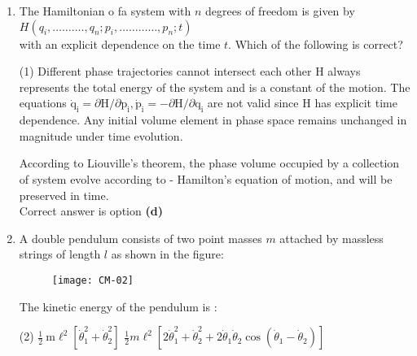 \begin{enumerate}
\begin{answer}
\begin{align*}
		\end{align*}
		The expression in bracket is just the total time derivative of $\lambda(\vec{x}, t)$.\\
		If we add a total time derivative of a function of $\overrightarrow{\mathrm{x}}$ and $\mathrm{t}$ to the Lagrangian, the equations of motion do not change.\\
		Correct answer is option \textbf{(d)}
	\end{answer}
	\item The Hamiltonian o fa system with $n$ degrees of freedom is given by \\$H\left(q_{i}, \ldots \ldots \ldots ., q_{n} ; p_{i}, \ldots \ldots \ldots \ldots, p_{n} ; t\right)$\\
	with an explicit dependence on the time $t$. Which of the following is correct?
	 \begin{tasks}(1)
		\task[\textbf{a.}]Different phase trajectories cannot intersect each other
		\task[\textbf{b.}]H always represents the total energy of the system and is a constant of the motion.
		\task[\textbf{c.}]The equations $\dot{\mathrm{q}}_{\mathrm{i}}=\partial \mathrm{H} / \partial \mathrm{p}_{\mathrm{i}}, \dot{\mathrm{p}}_{\mathrm{i}}=-\partial \mathrm{H} / \partial \mathrm{q}_{\mathrm{i}}$ are not valid since H has explicit time dependence.
		\task[\textbf{d.}] Any initial volume element in phase space remains unchanged in magnitude under time evolution.
	\end{tasks}
\begin{answer}
	According to Liouville's theorem, the phase volume occupied by a collection of system evolve according to - Hamilton's equation of motion, and will be preserved in time.\\
	Correct answer is option \textbf{(d)}
\end{answer}
	\item A double pendulum consists of two point masses $m$ attached by massless strings of length $l$ as shown in the figure:
	\begin{figure}[H]
		\centering
		\texttt{[image: CM-02]}
	\end{figure}
	The kinetic energy of the pendulum is :
	 \begin{tasks}(2)
		\task[\textbf{a.}]$\frac{1}{2} \mathrm{~m} \ell^{2}\left[\dot{\theta}_{1}^{2}+\dot{\theta}_{2}^{2}\right]$
		\task[\textbf{b.}]$\frac{1}{2} m \ell^{2}\left[2 \dot{\theta}_{1}^{2}+\dot{\theta}_{2}^{2}+2 \dot{\theta}_{1} \dot{\theta}_{2} \cos \left(\dot{\theta}_{1}-\dot{\theta}_{2}\right)\right]$

\end{tasks}
\end{enumerate}
